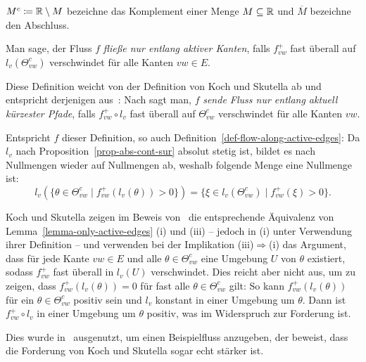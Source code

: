 \begin{notation}
	 $M^c\coloneq \mathbb{R}\setminus M$ bezeichne das Komplement einer Menge $M\subseteq\mathbb{R}$ und $\overline{M}$ bezeichne den Abschluss.
\end{notation}

\begin{definition}\label{def-flow-along-active-edges}
	Man sage, der Fluss $f$ \emph{fließe nur entlang aktiver Kanten}, falls $f_{vw}^+$ fast überall auf $l_v(\Theta_{vw}^c)$ verschwindet für alle Kanten $vw\in E$.
\end{definition}

\begin{remark}
	Diese Definition weicht von der Definition von Koch und Skutella ab und entspricht derjenigen aus~\cite[Definition 1]{Cominetti2015}:
	Nach \cite[Definition 2]{Koch2011} sagt man, $f$ \emph{sende Fluss nur entlang aktuell kürzester Pfade}, falls $f_{vw}^+\circ l_v$ fast überall auf $\Theta_{vw}^c$ verschwindet für alle Kanten $vw$.

	Entspricht $f$ dieser Definition, so auch Definition~\ref{def-flow-along-active-edges}: 
	Da $l_v$ nach Proposition~\ref{prop-abs-cont-sur} absolut stetig ist, bildet es nach~\cite[Kap. VII, Aufgabe 4.9]{Elstrodt2011} Nullmengen wieder auf Nullmengen ab, weshalb folgende Menge eine Nullmenge ist: \[ l_v(\{ \theta \in \Theta_{vw}^c \mid f_{vw}^+ (l_v(\theta)) > 0 \}) = \{ \xi \in l_v(\Theta_{vw}^c) \mid f_{vw}^+ (\xi) > 0 \}. \]
	 
	Koch und Skutella zeigen im Beweis von~\cite[Lemma 1]{Koch2011} die entsprechende Äquivalenz von Lemma~\ref{lemma-only-active-edges} (i) und (iii) -- jedoch in (i) unter Verwendung ihrer Definition -- und
	verwenden bei der Implikation (iii)$\Rightarrow$(i) das Argument, dass für jede Kante $vw\in E$ und alle $\theta\in \Theta_{vw}^c$ eine Umgebung $U$ von $\theta$ existiert, sodass $f_{vw}^+$ fast überall in $l_v(U)$ verschwindet.
	Dies reicht aber nicht aus, um zu zeigen, dass $f_{vw}^+(l_v(\theta))=0$ für fast alle $\theta\in\Theta_{vw}^c$ gilt:
	So kann $f_{vw}^+(l_v(\theta))$ für ein $\theta\in\Theta_{vw}^c$ positiv sein und $l_v$ konstant in einer Umgebung um $\theta$.
	Dann ist $f_{vw}^+ \circ l_v$ in einer Umgebung um $\theta$ positiv, was im Widerspruch zur Forderung ist.
	
	Dies wurde in~\cite[Example 2]{Cominetti2015} ausgenutzt, um einen Beispielfluss anzugeben, der beweist, dass die Forderung von Koch und Skutella sogar echt stärker ist.
\end{remark}

